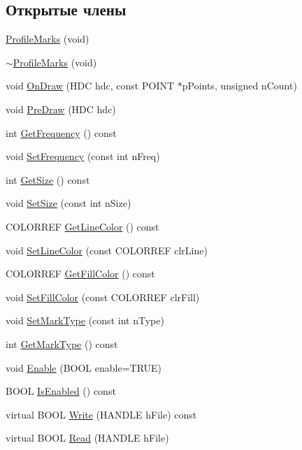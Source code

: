 \subsection*{Открытые члены}
\begin{DoxyCompactItemize}
\item 
\hyperlink{class_profile_marks_ac1d9331398f1091f03000fb70b4cebd0}{Profile\-Marks} (void)
\item 
\hyperlink{class_profile_marks_a74ad8199d7206269b733404f4b693573}{$\sim$\-Profile\-Marks} (void)
\item 
void \hyperlink{class_profile_marks_aa7966667f1baa875bc2bd8db7d909a37}{On\-Draw} (H\-D\-C hdc, const P\-O\-I\-N\-T $\ast$p\-Points, unsigned n\-Count)
\item 
void \hyperlink{class_profile_marks_ab243c85d1dc29170f18ae4c4a20ed789}{Pre\-Draw} (H\-D\-C hdc)
\item 
int \hyperlink{class_profile_marks_a051a19747efe246de75f7fc85ffd70ef}{Get\-Frequency} () const 
\item 
void \hyperlink{class_profile_marks_a1413fe406c87a46c8967c90b2dcd8dbe}{Set\-Frequency} (const int n\-Freq)
\item 
int \hyperlink{class_profile_marks_aa0d8285f49f82349a05303ce91e8aed5}{Get\-Size} () const 
\item 
void \hyperlink{class_profile_marks_a53183bc811f6dba3002f5c1f1ced8d18}{Set\-Size} (const int n\-Size)
\item 
C\-O\-L\-O\-R\-R\-E\-F \hyperlink{class_profile_marks_a412ce6c7398fe1e937d077c651bc6be9}{Get\-Line\-Color} () const 
\item 
void \hyperlink{class_profile_marks_a77b56c9b9d21376533dae53cee0a6f26}{Set\-Line\-Color} (const C\-O\-L\-O\-R\-R\-E\-F clr\-Line)
\item 
C\-O\-L\-O\-R\-R\-E\-F \hyperlink{class_profile_marks_a191e51521d74dd8210ae02260c1bf1b1}{Get\-Fill\-Color} () const 
\item 
void \hyperlink{class_profile_marks_aa6bcbcdbadf04e61e4b6c071f7541225}{Set\-Fill\-Color} (const C\-O\-L\-O\-R\-R\-E\-F clr\-Fill)
\item 
void \hyperlink{class_profile_marks_a178920b4ff1861824fcdc617ed872f55}{Set\-Mark\-Type} (const int n\-Type)
\item 
int \hyperlink{class_profile_marks_a6823d42202f99941e5c92008b9dbf4d1}{Get\-Mark\-Type} () const 
\item 
void \hyperlink{class_profile_marks_af6f6413f5d507f714cc9c38f228da4ce}{Enable} (B\-O\-O\-L enable=T\-R\-U\-E)
\item 
B\-O\-O\-L \hyperlink{class_profile_marks_a5edbf30ca2bff84f8736aad24d231795}{Is\-Enabled} () const 
\item 
virtual B\-O\-O\-L \hyperlink{class_profile_marks_a6f0d5141d95c02bc92ebb5ce9e96d559}{Write} (H\-A\-N\-D\-L\-E h\-File) const 
\item 
virtual B\-O\-O\-L \hyperlink{class_profile_marks_af10107761b4341881739dc5d2f574b53}{Read} (H\-A\-N\-D\-L\-E h\-File)
\end{DoxyCompactItemize}
